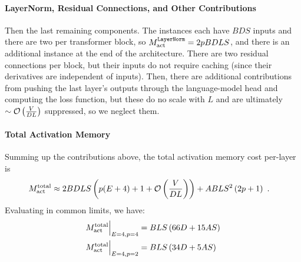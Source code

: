 \documentclass[11pt]{article}
\begin{document}
\paragraph{LayerNorm, Residual Connections, and Other Contributions}

Then the last remaining components. The  instances each have $ BDS $ inputs and
there are two per transformer block, so $ M _{ {\rm  act}  } ^\texttt{LayerNorm} = 2pBDLS $, and
there is an additional instance at the end of the architecture. There are two residual connections
per block, but their inputs do not require caching (since their derivatives are independent of
inputs). Then, there are additional contributions from pushing the last layer's outputs through the
language-model head and computing the loss function, but these do no scale with $ L $ and are
ultimately $ \sim \mathcal{O} \left( \frac{ V }{ DL } \right)  $ suppressed, so we neglect them.





\paragraph{Total Activation Memory}


Summing up the contributions above, the total activation memory cost per-layer is
\begin{align}
    M _{ {\rm act}  } ^{ {\rm  total}  } & \approx  2BDLS   \left ( p(E+4) + 1 + \mathcal{O} \left( \frac{
    V}{ DL } \right)  \right )
    + ABLS ^{ 2 } \left ( 2p+1\right ) \label{eq_act_mem_total_no_sharding}\ .
\end{align}
Evaluating in common limits, we have:
\begin{align}
    M _{ {\rm act}  } ^{ {\rm  total}  } \Big| _{ E=4, p=4 } &=BLS \left ( 66 D+15AS  \right ) \nonumber\\
    M _{ {\rm act}  } ^{ {\rm  total}  } \Big| _{ E=4, p=2 } &=BLS \left ( 34 D+5AS  \right )
\end{align}
\end{document}
